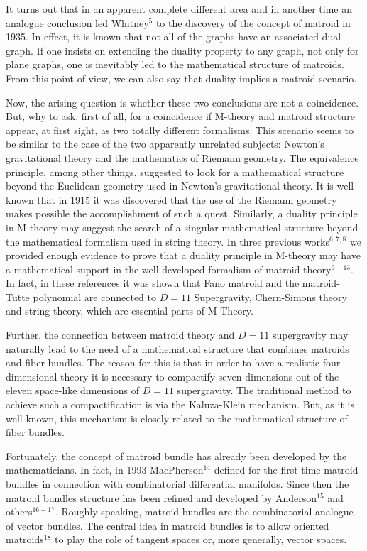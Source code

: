 \documentclass[a4paper,12pt]{article}
\begin{document}
It turns out that in an apparent complete different area and in another time
an analogue conclusion led Whitney$^{5}$ to the discovery of the concept of
matroid in 1935$.$ In effect, it is known that not all of the graphs have an
associated dual graph. If one insists on extending the duality property to
any graph, not only for plane graphs, one is inevitably led to the
mathematical structure of matroids. From this point of view, we can also say
that duality implies a matroid scenario.

Now, the arising question is whether these two conclusions are not a
coincidence. But, why to ask, first of all, for a coincidence if M-theory
and matroid structure appear, at first sight, as two totally different
formalisms. This scenario seems to be similar to the case of the two
apparently unrelated subjects: Newton's gravitational theory and the
mathematics of Riemann geometry. The equivalence principle, among other
things, suggested to look for a mathematical structure beyond the Euclidean
geometry used in Newton's gravitational theory. It is well known that in
1915 it was discovered that the use of the Riemann geometry makes possible
the accomplishment of such a quest. Similarly, a duality principle in
M-theory may suggest the search of a singular mathematical structure beyond
the mathematical formalism used in string theory. In three previous works$%
^{6,7,8}$ we provided enough evidence to prove that a duality principle in
M-theory may have a mathematical support in the well-developed formalism of
matroid-theory$^{9-13}$. In fact, in these references it was shown that Fano
matroid and the matroid-Tutte polynomial are connected to $D=11$
Supergravity, Chern-Simons theory and string theory, which are essential
parts of M-Theory.

Further, the connection between matroid theory and $D=11$ supergravity may
naturally lead to the need of a mathematical structure that combines
matroids and fiber bundles. The reason for this is that in order to have a
realistic four dimensional theory it is necessary to compactify seven
dimensions out of the eleven space-like dimensions of $D=11$ supergravity.
The traditional method to achieve such a compactification is via the
Kaluza-Klein mechanism. But, as it is well known, this mechanism is closely
related to the mathematical structure of fiber bundles.

Fortunately, the concept of matroid bundle has already been developed by the
mathematicians. In fact, in 1993 MacPherson$^{14}$ defined for the first
time matroid bundles in connection with combinatorial differential
manifolds. Since then the matroid bundles structure has been refined and
developed by Anderson$^{15}$ and others$^{16-17}.$ Roughly speaking, matroid
bundles are the combinatorial analogue of vector bundles. The central idea
in matroid bundles is to allow oriented matroids$^{18}$ to play the role of
tangent spaces or, more generally, vector spaces.
\end{document}
